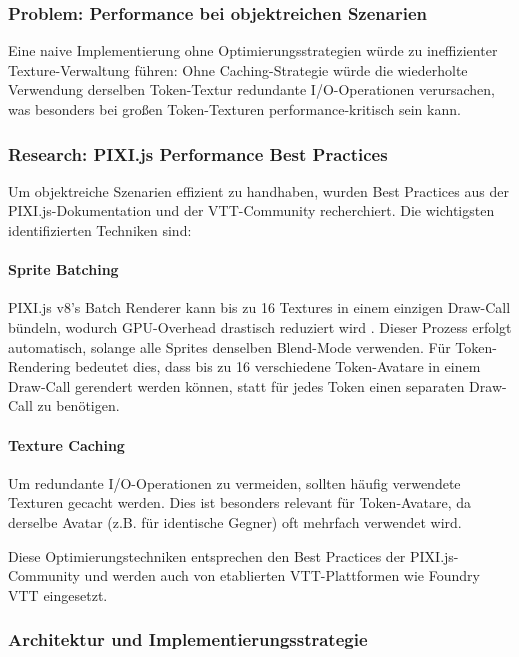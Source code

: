 \subsubsection{Problem: Performance bei objektreichen Szenarien}

Eine naive Implementierung ohne Optimierungsstrategien würde zu ineffizienter Texture-Verwaltung führen: Ohne Caching-Strategie würde die wiederholte Verwendung derselben Token-Textur redundante \ac{I/O}-Operationen verursachen, was besonders bei großen Token-Texturen performance-kritisch sein kann.

\subsubsection{Research: PIXI.js Performance Best Practices}

Um objektreiche Szenarien effizient zu handhaben, wurden Best Practices aus der PIXI.js-Dokumentation und der \ac{VTT}-Community recherchiert. Die wichtigsten identifizierten Techniken sind:

\paragraph{Sprite Batching}

PIXI.js v8's Batch Renderer kann bis zu 16 Textures in einem einzigen Draw-Call bündeln, wodurch \ac{GPU}-Overhead drastisch reduziert wird \autocite{PixiPerf2024}. Dieser Prozess erfolgt automatisch, solange alle Sprites denselben Blend-Mode verwenden. Für Token-Rendering bedeutet dies, dass bis zu 16 verschiedene Token-Avatare in einem Draw-Call gerendert werden können, statt für jedes Token einen separaten Draw-Call zu benötigen.

\paragraph{Texture Caching}

Um redundante \ac{I/O}-Operationen zu vermeiden, sollten häufig verwendete Texturen gecacht werden. Dies ist besonders relevant für Token-Avatare, da derselbe Avatar (z.B. für identische Gegner) oft mehrfach verwendet wird.

Diese Optimierungstechniken entsprechen den Best Practices der PIXI.js-Community \autocite{PixiPerf2024} und werden auch von etablierten \ac{VTT}-Plattformen wie Foundry \ac{VTT} eingesetzt.

\subsubsection{Architektur und Implementierungsstrategie}

